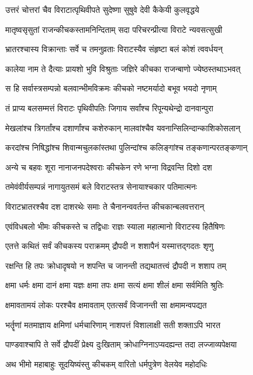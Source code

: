 \twolineshloka
{उत्तरं चोत्तरां चैव विराटात्पृथिवीपते}
{सुदेष्णा सुषुवे देवी कैकेयी कुलवृद्धये}


\twolineshloka
{मातृष्वसृसुतां राजन्कीचकस्तामनिन्दिताम्}
{सदा परिचरन्प्रीत्या विराटे न्यवसत्सुखी}


\twolineshloka
{भ्रातरश्चास्य विक्रान्ताः सर्वे च तमनुव्रताः}
{विराटस्यैव संहृष्टा बलं कोशं त्ववर्धयन्}


\twolineshloka
{कालेया नाम ते दैत्याः प्रायशो भुवि विश्रुताः}
{जज्ञिरे कीचका राजन्बाणो ज्येष्ठस्तथाऽभवत्}


\twolineshloka
{स हि सर्वास्त्रसम्पन्नो बलवान्भीमविक्रमः}
{कीचको नष्टमर्यादो बभूव भयदो नृणाम्}


\twolineshloka
{तं प्राप्य बलसम्मत्तं विराटः पृथिवीपतिः}
{जिगाय सर्वांश्च रिपून्यथेन्द्रो दानवान्पुरा}


\twolineshloka
{मेखलांश्च त्रिगर्तांश्च दशार्णांश्च कशेरुकान्}
{मालवांश्चैव यवनान्सिलिन्दान्काशिकोसलान्}


\twolineshloka
{करदांश्च निषिद्धांश्च शिवान्मचुलकांस्तथा}
{पुलिन्दांश्च कलिङ्गांश्च तङ्कणान्परतङ्कणान्}


\twolineshloka
{अन्ये च बहवः शूरा नानाजनपदेश्वराः}
{कीचकेन रणे भग्ना विद्रवन्ति दिशो दश}


\twolineshloka
{तमेवंवीर्यसम्पन्नं नागायुतसमं बले}
{विराटस्तत्र सेनायाश्चकार पतिमात्मनः}


\twolineshloka
{विराटभ्रातरश्चैव दश दाशरथेः समाः}
{ते चैनानन्ववर्तन्त कीचकान्बलवत्तरान्}


\twolineshloka
{एवंविधबलो भीमः कीचकस्ते च तद्विधाः}
{राज्ञः स्याला महात्मानो विराटस्य हितैषिणः}


\twolineshloka
{एतत्ते कथितं सर्वं कीचकस्य पराक्रमम्}
{द्रौपदी न शशापैनं यस्मात्तद्गदतः शृणु}


\twolineshloka
{रक्षन्ति हि तपः क्रोधादृषयो न शपन्ति च}
{जानन्ती तद्यथातत्त्वं द्रौपदी न शशाप तम्}


\twolineshloka
{क्षमा धर्मः क्षमा दानं क्षमा यज्ञः क्षमा तपः}
{क्षमा सत्यं क्षमा शीलं क्षमा सर्वमिति श्रुतिः}


\twolineshloka
{क्षमावतामयं लोकः परश्चैव क्षमावताम्}
{एतत्सर्वं विजानन्ती सा क्षमामन्वपद्यत}


\twolineshloka
{भर्तॄणां मतमाज्ञाय क्षमिणां धर्मचारिणाम्}
{नाशपत्तं विशालाक्षी सती शक्ताऽपि भारत}


\twolineshloka
{पाण्डवाश्चापि ते सर्वे द्रौपदीं प्रेक्ष्य दुःखिताम्}
{क्रोधाग्निनाऽप्यदह्यन्त तदा लज्जाव्यपेक्षया}


\twolineshloka
{अथ भीमो महाबाहुः सूदयिष्यंस्तु कीचकम्}
{वारितो धर्मपुत्रेण वेलयेव महोदधिः}


